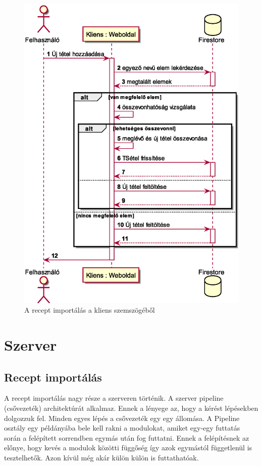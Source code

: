 \documentclass[12pt]{report}
\theoremstyle{definition}
\begin{document}
\noindent
\begin{figure}[H]
	\centering
	\includegraphics[width=.8\textwidth]{out/diagrams/clientShoppingListAdd/clientShoppingListAdd.eps}
	\caption{A recept importálás a kliens szemszögéből}
    \label{fig:clientShoppingListAdd}
\end{figure}

\section{Szerver}

\subsection{Recept importálás}
\label{serverImportsRecipe}
A recept importálás nagy része a szerveren történik. A szerver pipeline (csővezeték) architektúrát alkalmaz.
Ennek a lényege az, hogy a kérést lépésekben dolgozzuk fel. Minden egyes lépés a csővezeték egy egy állomása.
A Pipeline osztály egy példányába bele kell rakni a modulokat, amiket egy-egy futtatás során a felépített sorrendben egymás után fog futtatni.
Ennek a felépítésnek az előnye, hogy kevés a modulok közötti függőség így azok egymástól függetlenül is tesztelhetők.
Azon kívül még akár külön külön is futtathatóak. 
\end{document}
